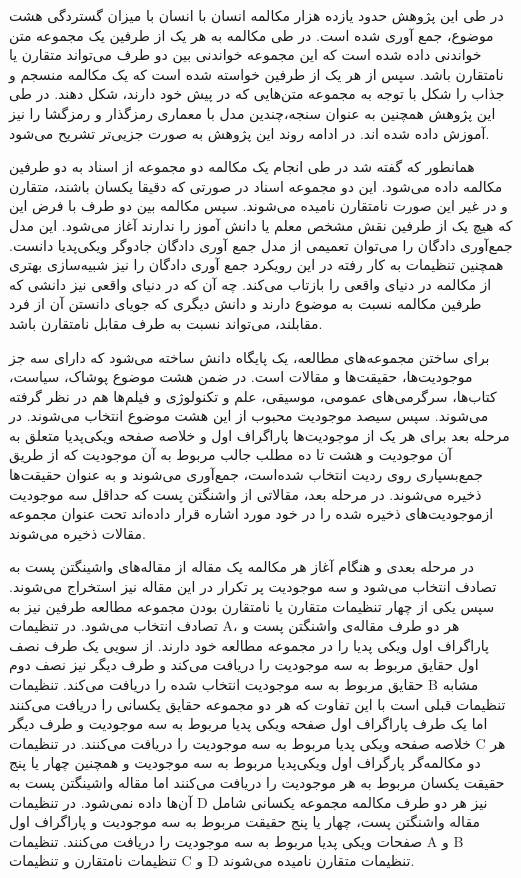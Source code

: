 در طی این پژوهش حدود یازده هزار مکالمه انسان با انسان با میزان گستردگی هشت موضوع، جمع آوری شده است. در طی مکالمه به هر یک از طرفین یک مجموعه متن خواندنی داده شده است که این مجموعه خواندنی بین دو طرف می‌تواند متقارن یا نامتقارن باشد. سپس از هر یک از طرفین خواسته ‌شده است که یک مکالمه منسجم و جذاب را شکل با توجه به مجموعه متن‌هایی که در پیش خود دارند، شکل دهند. 
در طی این پژوهش همچنین به عنوان سنجه،‌چندین مدل با معماری رمزگذار و رمزگشا را نیز آموزش داده شده اند. در ادامه روند این پژوهش به صورت جزیی‌تر تشریح می‌شود. 

همانطور که گفته شد در طی انجام یک مکالمه دو مجموعه از اسناد به دو طرفین مکالمه داده می‌شود. این دو مجموعه اسناد در صورتی که دقیقا یکسان باشند، متقارن و در غیر این صورت نامتقارن نامیده می‌شوند. سپس مکالمه بین دو طرف با فرض این که هیچ یک از طرفین نقش مشخص معلم یا دانش آموز را ندارند آغاز می‌شود. این مدل جمع‌آوری دادگان را می‌توان تعمیمی از مدل جمع آوری دادگان جادوگر ویکی‌پدیا دانست. همچنین تنظیمات به کار رفته در این رویکرد جمع آوری دادگان را نیز شبیه‌سازی بهتری از مکالمه در دنیای واقعی را بازتاب می‌کند. چه آن که در دنیای واقعی نیز دانشی که طرفین مکالمه نسبت به موضوع دارند و دانش دیگری که جویای دانستن آن از فرد مقابلند،‌ می‌تواند نسبت به طرف مقابل نامتقارن باشد. 

برای ساختن مجموعه‌های مطالعه، یک پایگاه دانش ساخته می‌شود که دارای سه جز موجودیت‌ها، حقیقت‌ها و مقالات است. در ضمن هشت موضوع پوشاک، سیاست، کتاب‌ها، سرگرمی‌های عمومی، موسیقی، علم و تکنولوژی و فیلم‌ها هم در نظر گرفته می‌شوند.
سپس سیصد موجودیت محبوب از این هشت موضوع انتخاب می‌شوند. 
در مرحله بعد برای هر یک از موجودیت‌ها پاراگراف اول و خلاصه صفحه ویکی‌پدیا 
متعلق به آن موجودیت و هشت تا ده مطلب جالب مربوط به آن موجودیت که از طریق جمع‌بسپاری روی ردیت انتخاب شده‌است، جمع‌آوری می‌شوند و به عنوان حقیقت‌ها ذخیره می‌شوند. 
در مرحله بعد، مقالاتی از واشنگتن پست که حداقل سه موجودیت ازموجودیت‌های ذخیره شده را در خود مورد اشاره قرار داده‌اند تحت عنوان مجموعه مقالات ذخیره می‌شوند.

در مرحله بعدی و هنگام آغاز هر مکالمه یک مقاله از مقاله‌های واشینگتن پست به تصادف انتخاب می‌شود  و سه موجودیت پر تکرار در این مقاله نیز استخراج می‌شوند. 
 سپس یکی از چهار تنظیمات متقارن یا نامتقارن بودن مجموعه مطالعه طرفین نیز به تصادف انتخاب می‌شود.
در تنظیمات A، هر دو طرف مقاله‌ی واشنگتن پست و پاراگراف اول  ویکی پدیا را در مجموعه مطالعه خود دارند. از سویی یک طرف نصف اول حقایق مربوط به سه موجودیت را دریافت می‌کند و طرف دیگر نیز نصف دوم حقایق مربوط به سه موجودیت انتخاب شده را دریافت می‌کند.
تنظیمات B مشابه تنظیمات قبلی است با این تفاوت که هر دو مجموعه حقایق یکسانی را دریافت می‌کنند اما یک طرف پاراگراف اول  صفحه ویکی پدیا مربوط به سه موجودیت و طرف دیگر خلاصه صفحه ویکی پدیا مربوط به سه موجودیت را دریافت می‌کنند.
در تنظیمات C هر دو مکالمه‌گر پارگراف اول ویکی‌پدیا مربوط به سه موجودیت و همچنین چهار یا پنج حقیقت یکسان مربوط به هر موجودیت را دریافت می‌کنند اما مقاله واشینگتن پست به آن‌ها داده نمی‌شود. در تنظیمات D نیز هر دو طرف مکالمه مجموعه یکسانی شامل مقاله واشنگتن پست، چهار یا پنج حقیقت مربوط به سه موجودیت و پاراگراف اول صفحات ویکی پدیا مربوط به سه موجودیت را دریافت می‌کنند. تنظیمات A و B تنظیمات نامتقارن و تنظیمات C و D تنظیمات متقارن نامیده می‌شوند.

